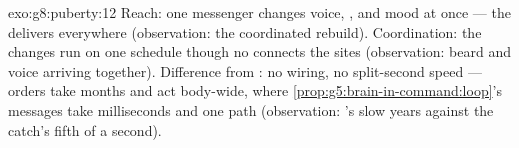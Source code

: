 \begin{solution}{exo:g8:puberty:12}
Reach: one messenger changes voice, ,  and
mood at once --- the  delivers everywhere
(observation: the coordinated rebuild). Coordination: the
changes run on one schedule though no  connects the
sites (observation: beard and voice arriving together).
Difference from : no wiring, no split-second speed
--- orders take months and act body-wide, where
\cref{prop:g5:brain-in-command:loop}'s messages take
milliseconds and one path (observation: 's slow
years against the catch's fifth of a second).
\end{solution}


